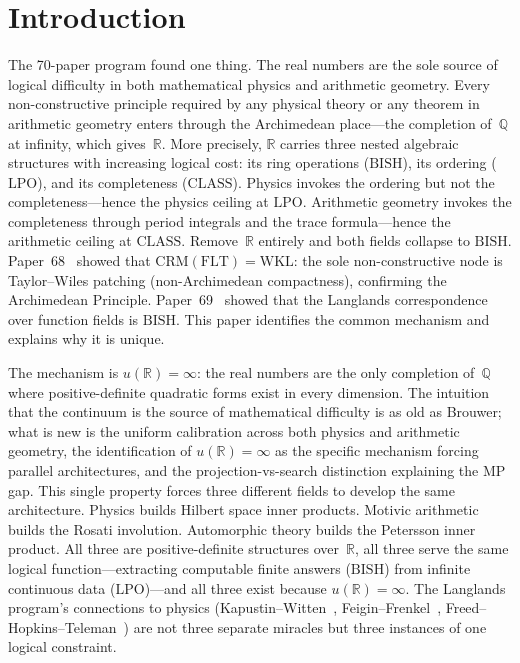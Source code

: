 \documentclass[11pt]{article}
\theoremstyle{definition}
\theoremstyle{remark}
\newcommand{\Q}{\mathbb{Q}}
\newcommand{\R}{\mathbb{R}}
\newcommand{\BISH}{\mathrm{BISH}}
\newcommand{\LPO}{\mathrm{LPO}}
\newcommand{\WKL}{\mathrm{WKL}}
\newcommand{\MP}{\mathrm{MP}}
\newcommand{\CLASS}{\mathrm{CLASS}}
\newcommand{\CRM}{\mathrm{CRM}}
\begin{document}
\section{Introduction}
\label{sec:intro}

The 70-paper program found one thing. The real numbers are the sole source of logical difficulty in both mathematical physics and arithmetic geometry. Every non-constructive principle required by any physical theory or any theorem in arithmetic geometry enters through the Archimedean place---the completion of~$\Q$ at infinity, which gives~$\R$. More precisely, $\R$ carries three nested algebraic structures with increasing logical cost: its ring operations ($\BISH$), its ordering ($\LPO$), and its completeness ($\CLASS$). Physics invokes the ordering but not the completeness---hence the physics ceiling at $\LPO$. Arithmetic geometry invokes the completeness through period integrals and the trace formula---hence the arithmetic ceiling at $\CLASS$. Remove~$\R$ entirely and both fields collapse to $\BISH$. Paper~68~\cite{Paper68} showed that $\CRM(\mathrm{FLT}) = \WKL$: the sole non-constructive node is Taylor--Wiles patching (non-Archimedean compactness), confirming the Archimedean Principle. Paper~69~\cite{Paper69} showed that the Langlands correspondence over function fields is $\BISH$. This paper identifies the common mechanism and explains why it is unique.

The mechanism is $u(\R) = \infty$: the real numbers are the only completion of~$\Q$ where positive-definite quadratic forms exist in every dimension. The intuition that the continuum is the source of mathematical difficulty is as old as Brouwer; what is new is the uniform calibration across both physics and arithmetic geometry, the identification of $u(\R) = \infty$ as the specific mechanism forcing parallel architectures, and the projection-vs-search distinction explaining the $\MP$ gap. This single property forces three different fields to develop the same architecture. Physics builds Hilbert space inner products. Motivic arithmetic builds the Rosati involution. Automorphic theory builds the Petersson inner product. All three are positive-definite structures over~$\R$, all three serve the same logical function---extracting computable finite answers ($\BISH$) from infinite continuous data ($\LPO$)---and all three exist because $u(\R) = \infty$. The Langlands program's connections to physics (Kapustin--Witten~\cite{KapustinWitten}, Feigin--Frenkel~\cite{FeiginFrenkel}, Freed--Hopkins--Teleman~\cite{FHT}) are not three separate miracles but three instances of one logical constraint.
\end{document}

